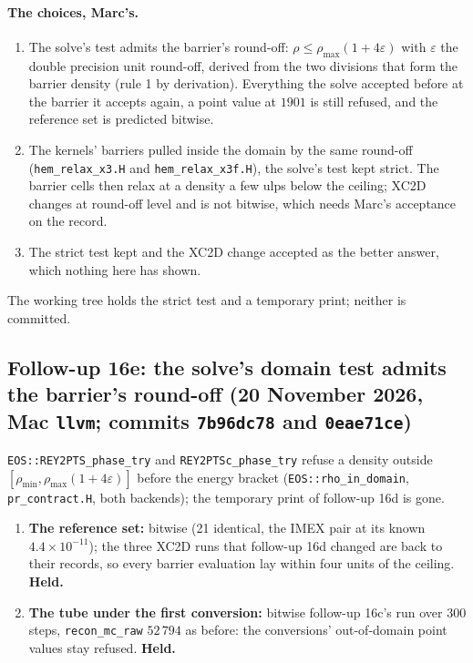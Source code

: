 \documentclass[11pt,a4paper]{article}
\newcommand{\code}[1]{\texttt{\small #1}}
\begin{document}
\paragraph{The choices, Marc's.}
\begin{enumerate}[nosep]
\item[(A)] The solve's test admits the barrier's round-off:
      $\rho \le \rho_{\max}(1 + 4\varepsilon)$ with $\varepsilon$ the
      double precision unit round-off, derived from the two divisions
      that form the barrier density (rule 1 by derivation).  Everything
      the solve accepted before at the barrier it accepts again, a point
      value at $1901$ is still refused, and the reference set is
      predicted bitwise.
\item[(B)] The kernels' barriers pulled inside the domain by the same
      round-off (\code{hem\_relax\_x3.H} and \code{hem\_relax\_x3f.H}),
      the solve's test kept strict.  The barrier cells then relax at a
      density a few ulps below the ceiling; XC2D changes at round-off
      level and is not bitwise, which needs Marc's acceptance on the
      record.
\item[(C)] The strict test kept and the XC2D change accepted as the
      better answer, which nothing here has shown.
\end{enumerate}
The working tree holds the strict test and a temporary print; neither is
committed.


\subsection{Follow-up 16e: the solve's domain test admits the barrier's round-off (20 November 2026, Mac \code{llvm}; commits \code{7b96dc78} and \code{0eae71ce})}

\code{EOS::REY2PTS\_phase\_try} and \code{REY2PTSc\_phase\_try} refuse
a density outside $[\rho_{\min}, \rho_{\max}(1 + 4\varepsilon)]$ before
the energy bracket (\code{EOS::rho\_in\_domain}, \code{pr\_contract.H},
both backends); the temporary print of follow-up 16d is gone.
\begin{enumerate}[nosep]
\item \textbf{The reference set:} bitwise (21 identical, the IMEX pair at its known $4.4\times10^{-11}$); the three XC2D runs that follow-up 16d changed are back to their records, so every barrier evaluation lay within four units of the ceiling.  \textbf{Held.}
\item \textbf{The tube under the first conversion:} bitwise follow-up 16c's run over 300 steps, \code{recon\_mc\_raw} $52\,794$ as before: the conversions' out-of-domain point values stay refused.  \textbf{Held.}
\end{enumerate}
\end{document}
